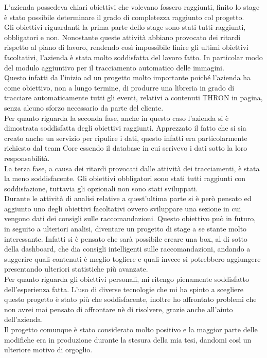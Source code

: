 \documentclass[a4paper, 12pt, twoside, openright]{book}
\begin{document}
L'azienda possedeva chiari obiettivi che volevano fossero raggiunti, finito lo stage è stato possibile determinare il grado di completezza raggiunto col progetto.\\
Gli obiettivi riguardanti la prima parte dello stage sono stati tutti raggiunti, obbligatori e non. Nonostante queste attività abbiano provocato dei ritardi rispetto al piano di lavoro, rendendo così impossibile finire gli ultimi obiettivi facoltativi, l'azienda è stata molto soddisfatta del lavoro fatto. In particolar modo del modulo aggiuntivo per il tracciamento automatico delle immagini.\\
Questo infatti da l'inizio ad un progetto molto importante poiché l'azienda ha come obiettivo, non a lungo termine, di produrre una libreria in grado di tracciare automaticamente tutti gli eventi, relativi a contenuti THRON in pagina, senza alcuno sforzo necessario da parte del cliente.\\
Per quanto riguarda la seconda fase, anche in questo caso l'azienda si è dimostrata soddisfatta degli obiettivi raggiunti. Apprezzato il fatto che si sia creato anche un servizio per ripulire i dati, questo infatti era particolarmente richiesto dal team Core essendo il database in cui scrivevo i dati sotto la loro responsabilità.\\
La terza fase, a causa dei ritardi provocati dalle attività dei tracciamenti, è stata la meno soddisfacente. Gli obiettivi obbligatori sono stati tutti raggiunti con soddisfazione, tuttavia gli opzionali non sono stati sviluppati.\\
Durante le attività di analisi relative a quest'ultima parte si è però pensato ed aggiunto uno degli obiettivi facoltativi ovvero sviluppare una sezione in cui vengono dati dei consigli sulle raccomandazioni. Questo obiettivo può in futuro, in seguito a ulteriori analisi, diventare un progetto di stage a se stante molto interessante. Infatti si è pensato che sarà possibile creare una box, al di sotto della dashboard, che dia consigli intelligenti sulle raccomandazioni, andando a suggerire quali contenuti è meglio togliere e quali invece si potrebbero aggiungere presentando ulteriori statistiche più avanzate.\\

Per quanto riguarda gli obiettivi personali, mi ritengo pienamente soddisfatto dell'esperienza fatta. L'uso di diverse tecnologie che mi ha spinto a scegliere questo progetto è stato più che soddisfacente, inoltre ho affrontato problemi che non avrei mai pensato di affrontare nè di risolvere, grazie anche all'aiuto dell'azienda.\\
Il progetto comunque è stato considerato molto positivo e la maggior parte delle modifiche era in produzione durante la stesura della mia tesi, dandomi così un ulteriore motivo di orgoglio.\\
\end{document}
